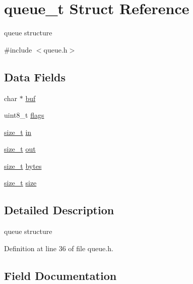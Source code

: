 \hypertarget{structqueue__t}{}\section{queue\+\_\+t Struct Reference}
\label{structqueue__t}


queue structure  




{\ttfamily \#include $<$queue.\+h$>$}

\subsection*{Data Fields}
\begin{DoxyCompactItemize}
\item 
char $\ast$ \hyperlink{structqueue__t_aaee81421d150a17123a2b858d5b1685d}{buf}
\item 
uint8\+\_\+t \hyperlink{structqueue__t_a2a516773a572c746d461c9df3cb30387}{flags}
\item 
\hyperlink{user__config_8h_aea0c7eab1ce1eebb4e879ef4e23c16ee}{size\+\_\+t} \hyperlink{structqueue__t_a7a6832e36c70a1db7fddc93fb6be9d63}{in}
\item 
\hyperlink{user__config_8h_aea0c7eab1ce1eebb4e879ef4e23c16ee}{size\+\_\+t} \hyperlink{structqueue__t_a8f6e1c623d2ceed398a71a0aab93b0fa}{out}
\item 
\hyperlink{user__config_8h_aea0c7eab1ce1eebb4e879ef4e23c16ee}{size\+\_\+t} \hyperlink{structqueue__t_a58398d4ee60bc90ffba2bc3488fe185b}{bytes}
\item 
\hyperlink{user__config_8h_aea0c7eab1ce1eebb4e879ef4e23c16ee}{size\+\_\+t} \hyperlink{structqueue__t_a83a13b888f9d4ef127d706559818b779}{size}
\end{DoxyCompactItemize}


\subsection{Detailed Description}
queue structure 

Definition at line 36 of file queue.\+h.



\subsection{Field Documentation}
\mbox{\label{structqueue__t_aaee81421d150a17123a2b858d5b1685d}} 
